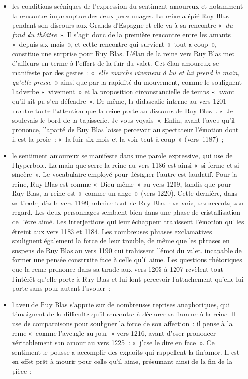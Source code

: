 {\begin{itemize}
\item les conditions scéniques de l'expression du sentiment amoureux et notamment
la rencontre impromptue des deux personnages. La reine a épié Ruy Blas pendant
son discours aux Grands d'Espagne et elle va à sa rencontre «~\textit{du fond du théâtre}~».
Il s'agit donc de la première rencontre entre les amants «~depuis six mois~», et cette
rencontre qui survient «~tout à coup~», constitue une surprise pour Ruy Blas. L'élan de
la reine vers Ruy Blas met d'ailleurs un terme à l'effort de la fuir du valet. Cet élan
amoureux se manifeste par des gestes~: «~\textit{elle marche vivement à lui et lui prend la
main, qu'elle presse}~» ainsi que par la rapidité du mouvement, comme le soulignent
l'adverbe «~vivement~» et la proposition circonstancielle de temps «~avant qu'il ait pu
s'en défendre~». De même, la didascalie interne au vers 1201 montre toute l'attention que la reine porte au discours de Ruy Blas~: «~Je soulevais le bord de la tapisserie. Je
vous voyais~». Enfin, avant l'aveu qu'il prononce, l'aparté de Ruy Blas laisse percevoir
au spectateur l'émotion dont il est la proie~: «~la fuir six mois et la voir tout à coup~» (vers~1187)~;
\item le sentiment amoureux se manifeste dans une parole expressive, qui use de
l'hyperbole. La main que serre la reine au vers 1186 est ainsi «~si ferme et si sincère~».
Le vocabulaire employé pour désigner l'autre est laudatif. Pour la reine, Ruy Blas est
comme «~Dieu même~» au vers 1209, tandis que pour Ruy Blas, la reine est «~comme
un ange~» (vers 1220). Cette dernière, dans sa tirade, dès le vers 1199, admire tout
de Ruy Blas~: sa voix, ses accents, son regard. Les deux personnages semblent bien
dans une phase de cristallisation de l'être aimé. Les interjections qui leur échappent
trahissent l'émotion qui les étreint aux vers 1183 et 1184. Les nombreuses phrases
exclamatives soulignent également la force de leur trouble, de même que les phrases
en suspens de Ruy Blas au vers 1190 qui trahissent l'émoi du valet, incapable de
former une pensée construite face à celle qu'il aime. Les questions rhétoriques que la
reine prononce dans sa tirade aux vers 1205 à 1207 révèlent tout l'intérêt qu'elle porte
à Ruy Blas et lui font percevoir l'attachement qu'elle lui porte sans pour autant
l'avouer~;
\item l'aveu de Ruy Blas s'appuie sur de nombreuses reprises anaphoriques, qui
témoignent de la difficulté qu'il rencontre à déclarer sa flamme à la reine. Il use de
comparaisons pour souligner la force de son affection~: il pense à la reine «~comme
l'aveugle au jour~» vers 1216, avant d'oser prononcer véritablement son amour au vers
1225~: «~j'ose le dire en face~». Ce sentiment le pousse à accomplir des exploits qui
rappellent la fin'amor. Il est en effet prêt à mourir pour celle qu'il aime, présumant ainsi
de la fin de la pièce~;
\end{itemize}

}
